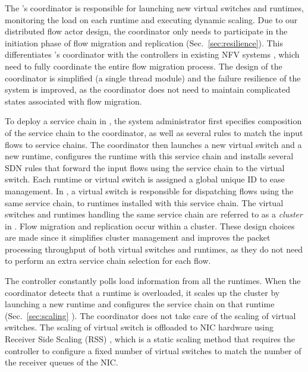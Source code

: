 
The \nfactor's coordinator is responsible for launching new virtual switches and runtimes, monitoring the load on each runtime and executing dynamic scaling. Due to our distributed flow actor design, the coordinator only needs to participate in the initiation phase of flow migration and replication (Sec.~\ref{sec:resilience}). This differentiates \nfactor's coordinator with the controllers in existing NFV systems \cite{gember2015opennf}\cite{rajagopalan2013split}, which need to fully coordinate the entire flow migration process.
The design of the coordinator is simplified (a single thread module) and the failure resilience of the system is improved, as the coordinator does not need to maintain complicated states associated with flow migration.

To deploy a service chain in \nfactor, the system administrator first specifies composition of the service chain to the coordinator, as well as several rules to match the input flows to service chains. %
The coordinator then launches a new virtual switch and a new runtime, configures the runtime with this service chain and installs several SDN rules that forward the input flows using the service chain to the virtual switch. %
Each runtime or virtual switch is assigned a global unique ID to ease management.  In \nfactor, a virtual switch is responsible for dispatching flows using the same service chain, to runtimes installed with this service chain. The virtual switches and runtimes handling the same service chain are referred to as a {\em cluster} in \nfactor. Flow migration and replication occur within a cluster. These design choices are made since it simplifies cluster management and improves the packet processing throughput of both virtual switches and runtimes, as they do not need to perform an extra service chain selection for each flow.


The controller constantly polls load information from all the runtimes. When the coordinator detects that a runtime is overloaded, it scales up the cluster by launching a new runtime and configures the service chain on that runtime (Sec.~\ref{sec:scaling}%
). The coordinator does not take care of the scaling of virtual switches. The scaling of virtual switch is offloaded to NIC hardware using Receiver Side Scaling (RSS) \cite{rss, jeong2014mtcp}, which is a static scaling method that requires the controller to configure a fixed number of virtual switches to match the number of the receiver queues of the NIC.  %

